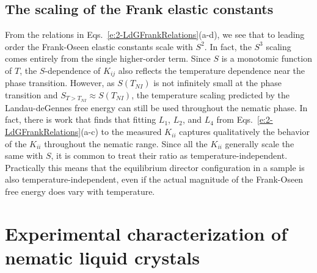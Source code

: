 \subsection{The scaling of the Frank elastic constants}
From the relations in Eqs.~\ref{e:2-LdGFrankRelations}(a-d), we see that to leading order the Frank-Oseen elastic constants scale with $S^2$.
In fact, the $S^3$ scaling comes entirely from the single higher-order term.
Since $S$ is a monotomic function of $T$, the $S$-dependence of $K_{ij}$ also reflects the temperature dependence near the phase transition.
However, as $S(T_{NI})$ is not infinitely small at the phase transition and $S_{T > T_{NI}} \approx S(T_{NI})$, the temperature scaling predicted by the Landau-deGennes free energy can still be used throughout the nematic phase.
In fact, there is work that finds that fitting $L_1$, $L_2$, and $L_4$ from Eqs.~\ref{e:2-LdGFrankRelations}(a-c) to the measured $K_{ii}$ captures qualitatively the behavior of the $K_{ii}$ throughout the nematic range.
Since all the $K_{ii}$ generally scale the same with $S$, it is common to treat their ratio as temperature-independent.
Practically this means that the equilibrium director configuration in a sample is also temperature-independent, even if the actual magnitude of the Frank-Oseen free energy does vary with temperature.




\section{Experimental characterization of nematic liquid crystals}
